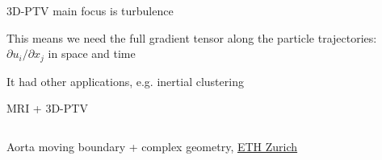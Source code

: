     
\begin{frame}[label=app-13]{3D-PTV main focus is turbulence}
    \begin{cardTiny} 
    This means we need  the \alert{full gradient tensor} along the particle trajectories:
    $\partial u_{i}/\partial x_{j}$ in space and time
    \end{cardTiny}
    \begin{multicols}{2}
    \centering
    \end{multicols}
    \end{frame}
    
    \begin{frame}[label=app-14]{It had other applications, e.g. inertial clustering}
    \centering{}
    \end{frame}
    
\begin{frame}[label=app-15]{MRI + 3D-PTV}
    \begin{columns}
        \centering{}
    \end{columns}
\end{frame}

\begin{frame}[label=app-4a]{Aorta moving boundary + complex geometry, \href{https://www.dropbox.com/s/p1xnc7mefoqboti/aorta_rigid.mp4?dl=0}{ETH Zurich}}
\end{frame}
    
